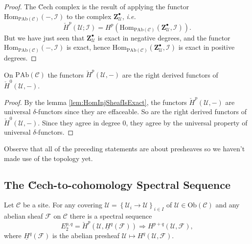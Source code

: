   \begin{proof}
  The \u Cech complex is the result of applying the functor $\text{Hom}_{\text{PAb}(\mathcal{C})}(-, \mathcal{I}) $ to the complex $ \mathbf{Z}^\bullet_\mathcal{U} $, {\it i.e.}
    $$
    \check H^p(\mathcal{U} ; \mathcal{I}) = H^p (\text{Hom}_{\text{PAb}(\mathcal{C})} (\mathbf{Z}^\bullet_\mathcal{U}, \mathcal{I})).
    $$
 But we have just seen that $\mathbf{Z}^\bullet_\mathcal{U}$ is exact in negative degrees, and the functor $\text{Hom}_{\text{PAb}(\mathcal{C})}(-, \mathcal{I})$ is exact, hence $\text{Hom}_{\text{PAb}(\mathcal{C})} (\mathbf{Z}^\bullet_\mathcal{U}, \mathcal{I})$ is exact in positive degrees.
  \end{proof}
  
  \begin{theorem} 
  On $\text{PAb}(\mathcal{C})$ the functors $\check{H}^p(\mathcal{U}, -)$ are the right derived functors of $\check{H}^0(\mathcal{U}, -)$.  
  \end{theorem}
  
  \begin{proof}
 By the lemma \ref{lem:HomInjSheafIsExact}, the functors $\check H^p(\mathcal{U}, -)$ are universal $\delta$-functors since they are effaceable.  So are the right derived functors of $\check H^0(\mathcal{U}, -)$.  Since they agree in degree $0$, they agree by the universal property of universal $\delta$-functors.
  \end{proof}

\begin{remark}
Observe that all of the preceding statements are about presheaves so we haven't made use of the topology yet. 
\end{remark}

\subsection{The \u Cech-to-cohomology Spectral Sequence}

\begin{theorem} \label{thm:SpectralSequenceCechToCohom}
Let $\mathcal{C}$ be a site. For any covering $\mathcal{U}= \left\{\mathcal{U}_i\to \mathcal{U}\right\}_{i\in I}$ of  $\mathcal{U}\in \text{Ob}(\mathcal{C})$ and any abelian sheaf $\mathcal{F}$ on $\mathcal{C}$ there is a spectral sequence 
  $$
 E_2^{p, q}
  =
 \check H^p(\mathcal{U},\underline{H}^q(\mathcal{F})) \Rightarrow H^{p+q}(\mathcal{U}, \mathcal{F}),
$$
    where $\underline{H}^q(\mathcal{F})$ is the abelian presheaf  $\mathcal{U}\mapsto H^q(\mathcal{U}, \mathcal{F})$.  
  \end{theorem}
  
